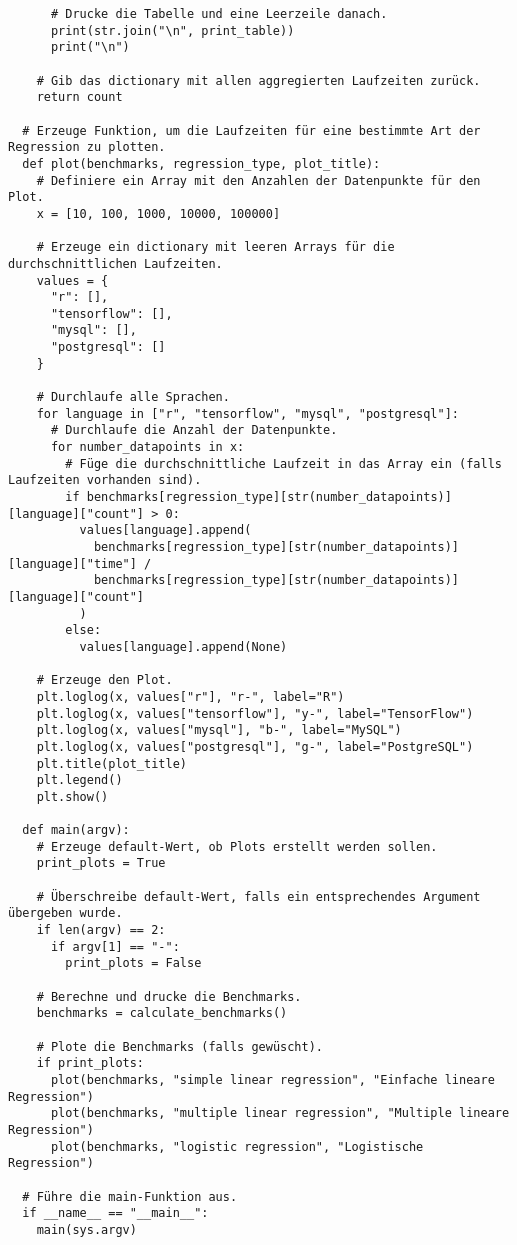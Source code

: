 \begin{verbatim}
      # Drucke die Tabelle und eine Leerzeile danach.
      print(str.join("\n", print_table))
      print("\n")

    # Gib das dictionary mit allen aggregierten Laufzeiten zurück.
    return count

  # Erzeuge Funktion, um die Laufzeiten für eine bestimmte Art der Regression zu plotten.
  def plot(benchmarks, regression_type, plot_title):
    # Definiere ein Array mit den Anzahlen der Datenpunkte für den Plot.
    x = [10, 100, 1000, 10000, 100000]

    # Erzeuge ein dictionary mit leeren Arrays für die durchschnittlichen Laufzeiten.
    values = {
      "r": [],
      "tensorflow": [],
      "mysql": [],
      "postgresql": []
    }

    # Durchlaufe alle Sprachen.
    for language in ["r", "tensorflow", "mysql", "postgresql"]:
      # Durchlaufe die Anzahl der Datenpunkte.
      for number_datapoints in x:
        # Füge die durchschnittliche Laufzeit in das Array ein (falls Laufzeiten vorhanden sind).
        if benchmarks[regression_type][str(number_datapoints)][language]["count"] > 0:
          values[language].append(
            benchmarks[regression_type][str(number_datapoints)][language]["time"] /
            benchmarks[regression_type][str(number_datapoints)][language]["count"]
          )
        else:
          values[language].append(None)

    # Erzeuge den Plot.
    plt.loglog(x, values["r"], "r-", label="R")
    plt.loglog(x, values["tensorflow"], "y-", label="TensorFlow")
    plt.loglog(x, values["mysql"], "b-", label="MySQL")
    plt.loglog(x, values["postgresql"], "g-", label="PostgreSQL")
    plt.title(plot_title)
    plt.legend()
    plt.show()

  def main(argv):
    # Erzeuge default-Wert, ob Plots erstellt werden sollen.
    print_plots = True

    # Überschreibe default-Wert, falls ein entsprechendes Argument übergeben wurde.
    if len(argv) == 2:
      if argv[1] == "-":
        print_plots = False

    # Berechne und drucke die Benchmarks.
    benchmarks = calculate_benchmarks()

    # Plote die Benchmarks (falls gewüscht).
    if print_plots:
      plot(benchmarks, "simple linear regression", "Einfache lineare Regression")
      plot(benchmarks, "multiple linear regression", "Multiple lineare Regression")
      plot(benchmarks, "logistic regression", "Logistische Regression")

  # Führe die main-Funktion aus.
  if __name__ == "__main__":
    main(sys.argv)
\end{verbatim}
